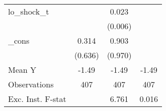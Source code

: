 {\begin{tabular}{l*{3}{c}}
\addlinespace
lo\_shock\_t  &                     &       0.023\sym{***}&                     \\
            &                     &     (0.006)         &                     \\
\addlinespace
\_cons      &       0.314         &       0.903         &                     \\
            &     (0.636)         &     (0.970)         &                     \\
\midrule
Mean Y      &       -1.49         &       -1.49         &       -1.49         \\
Observations&         407         &         407         &         407         \\
Exc. Inst. F-stat&                     &       6.761         &       0.016         \\
\bottomrule
\end{tabular}
}
